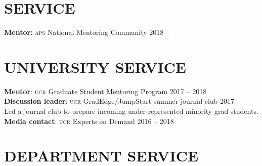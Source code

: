 \documentclass[margin,line]{resume}
\newcommand{\scap}[1]{\textsc{\MakeLowercase{#1}}}
\begin{document}
\begin{resume}
\section{\footnotesize \sc
\sffamily 
{}SERVICE
}



\textbf{Mentor:} \scap{APS} National Mentoring Community
\hfill 2018 -- \phantom{2018}%





\section{\footnotesize \sc
\sffamily 
{}UNIVERSITY SERVICE
}


\textbf{Mentor}: \scap{UCR} Graduate Student Mentoring Program
 \hfill {2017 -- {2018}}\vspace{.3mm}\\
%
\textbf{Discussion leader}: \scap{UCR} GradEdge/JumpStart summer journal club
 \hfill {2017}\vspace{-.75mm}
 \\
\phantom{..} {\small Led a journal club to prepare incoming under-represented minority grad students.}
\vspace{.3mm}\\
\textbf{Media contact}: \scap{UCR} Experts on Demand
 \hfill {2016 -- {2018}}







\section{\footnotesize \sc
\sffamily 
{}DEPARTMENT SERVICE
}


\end{resume}
\end{document}
